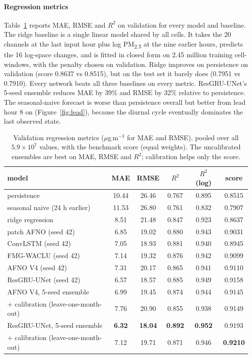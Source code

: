 \documentclass[10pt]{article}
\newcommand{\PM}{PM\textsubscript{2.5}}
\begin{document}
\paragraph{Regression metrics}
Table~\ref{tab:regression} reports MAE, RMSE and $R^2$ on validation for every model and baseline. The ridge baseline is a single linear model shared by all cells. It takes the 20 channels at the last input hour plus log \PM{} at the nine earlier hours, predicts the 16 log-space changes, and is fitted in closed form \citep{hoerl1970} on 2.45 million training cell-windows, with the penalty chosen on validation. Ridge improves on persistence on validation (score 0.8637 vs 0.8515), but on the test set it barely does (0.7951 vs 0.7910). Every network beats all three baselines on every metric. ResGRU-UNet's 5-seed ensemble reduces MAE by 39\% and RMSE by 32\% relative to persistence. The seasonal-naive forecast is worse than persistence overall but better from lead hour 8 on (Figure~\ref{fig:lead}), because the diurnal cycle eventually dominates the last observed state.

\begin{table}[t]
\caption{Validation regression metrics ($\mu$g\,m$^{-3}$ for MAE and RMSE), pooled over all $5.9\times10^7$ values, with the benchmark score (equal weights). The uncalibrated ensembles are best on MAE, RMSE and $R^2$; calibration helps only the score.}
\label{tab:regression}
\centering\small
\begin{tabular}{@{}l c c c c c@{}}
\toprule
model & MAE & RMSE & $R^2$ & $R^2$ (log) & score \\
\midrule
persistence & 10.44 & 26.46 & 0.767 & 0.895 & 0.8515 \\
seasonal naive (24 h earlier) & 11.53 & 26.80 & 0.761 & 0.832 & 0.7907 \\
ridge regression & 8.51 & 21.48 & 0.847 & 0.923 & 0.8637 \\
\midrule
patch AFNO (seed 42) & 6.85 & 19.02 & 0.880 & 0.943 & 0.9031 \\
ConvLSTM (seed 42) & 7.05 & 18.93 & 0.881 & 0.940 & 0.8945 \\
FMG-WACLU (seed 42) & 7.14 & 19.32 & 0.876 & 0.942 & 0.9099 \\
AFNO V4 (seed 42) & 7.31 & 20.17 & 0.865 & 0.941 & 0.9110 \\
ResGRU-UNet (seed 42) & 6.57 & 18.57 & 0.885 & 0.949 & 0.9158 \\
\midrule
AFNO V4, 5-seed ensemble & 6.99 & 19.45 & 0.874 & 0.944 & 0.9145 \\
\quad + calibration (leave-one-month-out) & 7.76 & 20.90 & 0.855 & 0.938 & 0.9149 \\
ResGRU-UNet, 5-seed ensemble & \textbf{6.32} & \textbf{18.04} & \textbf{0.892} & \textbf{0.952} & 0.9193 \\
\quad + calibration (leave-one-month-out) & 7.12 & 19.71 & 0.871 & 0.946 & \textbf{0.9210} \\
\bottomrule
\end{tabular}
\end{table}
\end{document}
